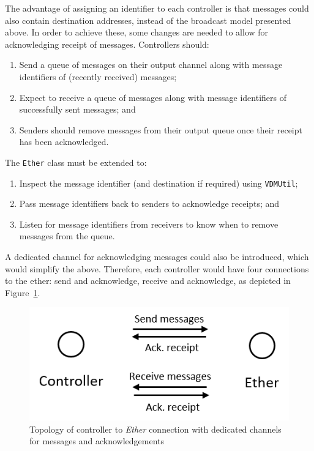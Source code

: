 The advantage of assigning an identifier to each controller is that messages could also contain destination addresses, instead of the broadcast model presented above. In order to achieve these, some changes are needed to allow for acknowledging receipt of messages. Controllers should:

\begin{enumerate}[noitemsep]
\item Send a queue of messages on their output channel along with message identifiers of (recently received) messages;
\item Expect to receive a queue of messages along with message identifiers of successfully sent messages; and
\item Senders should remove messages from their output queue once their receipt has been acknowledged.
\end{enumerate}

The \texttt{Ether} class must be extended to:

\begin{enumerate}[noitemsep]
\item Inspect the message identifier (and destination if required) using \texttt{VDMUtil};
\item Pass message identifiers back to senders to acknowledge receipts; and
\item Listen for message identifiers from receivers to know when to remove messages from the queue.
\end{enumerate}

A dedicated channel for acknowledging messages could also be introduced, which would simplify the above. Therefore, each controller would have four connections to the ether: send and acknowledge, receive and acknowledge, as depicted in Figure~\ref{fig:ack}.

\begin{figure}
\centering
\includegraphics[scale=0.6]{figures/ack_channel}
\caption{Topology of controller to \emph{Ether} connection with dedicated channels for messages and acknowledgements}
\label{fig:ack}
\end{figure}

